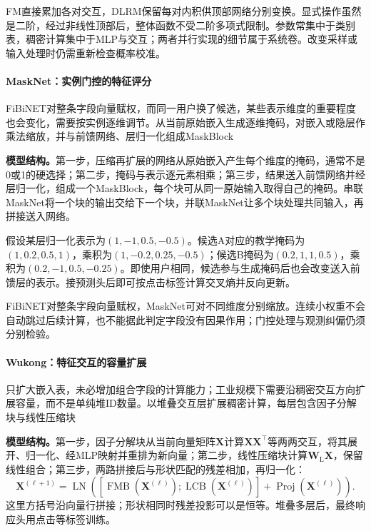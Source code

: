FM直接累加各对交互，DLRM保留每对内积供顶部网络分别变换。显式操作虽然是二阶，经过非线性顶部后，整体函数不受二阶多项式限制。参数常集中于类别表，稠密计算集中于MLP与交互；两者并行实现的细节属于系统卷。改变采样或输入处理时仍需重新检查概率校准。

\paragraph{MaskNet：实例门控的特征评分}
\label{sec:rs-masknet}

FiBiNET对整条字段向量赋权，而同一用户换了候选，某些表示维度的重要程度也会变化，需要按实例逐维调节。从当前原始嵌入生成逐维掩码，对嵌入或隐层作乘法缩放，并与前馈网络、层归一化组成MaskBlock

\textbf{模型结构。}第一步，压缩再扩展的网络从原始嵌入产生每个维度的掩码，通常不是0或1的硬选择；第二步，掩码与表示逐元素相乘；第三步，结果送入前馈网络并经层归一化，组成一个MaskBlock，每个块可从同一原始输入取得自己的掩码。串联MaskNet将一个块的输出交给下一个块，并联MaskNet让多个块处理共同输入，再拼接送入网络。

假设某层归一化表示为$(1,-1,0.5,-0.5)$。候选A对应的教学掩码为$(1,0.2,0.5,1)$，乘积为$(1,-0.2,0.25,-0.5)$；候选B掩码为$(0.2,1,1,0.5)$，乘积为$(0.2,-1,0.5,-0.25)$。即使用户相同，候选参与生成掩码后也会改变送入前馈层的表示。接预测头后即可按点击标签计算交叉熵并反向更新。

FiBiNET对整条字段向量赋权，MaskNet可对不同维度分别缩放。连续小权重不会自动跳过后续计算，也不能据此判定字段没有因果作用；门控处理与观测纠偏仍须分别检验。

\paragraph{Wukong：特征交互的容量扩展}
\label{sec:rs-wukong}

只扩大嵌入表，未必增加组合字段的计算能力；工业规模下需要沿稠密交互方向扩展容量，而不是单纯堆ID数量。以堆叠交互层扩展稠密计算，每层包含因子分解块与线性压缩块

\textbf{模型结构。}第一步，因子分解块从当前向量矩阵$\bm X$计算$\bm X\bm X^\top$等两两交互，将其展开、归一化、经MLP映射并重排为新向量；第二步，线性压缩块计算$\bm W_{\mathrm L}\bm X$，保留线性组合；第三步，两路拼接后与形状匹配的残差相加，再归一化：
\[
 \bm X^{(\ell+1)}=\operatorname{LN}\!\left(
 [\operatorname{FMB}(\bm X^{(\ell)});
  \operatorname{LCB}(\bm X^{(\ell)})]
  +\operatorname{Proj}(\bm X^{(\ell)})\right).
\]
这里方括号沿向量行拼接；形状相同时残差投影可以是恒等。堆叠多层后，最终响应头用点击等标签训练。

